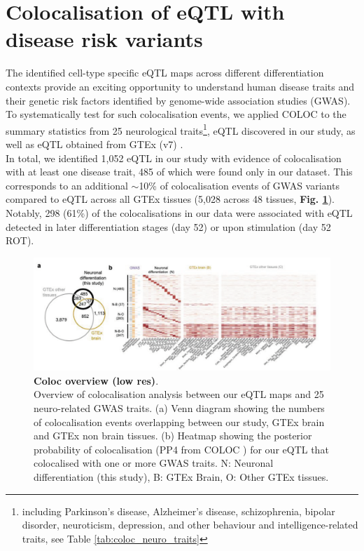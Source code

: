 \clearpage

\section{Colocalisation of eQTL with disease risk variants}
\label{sec:neuroseq_coloc}

The identified cell-type specific eQTL maps across different differentiation contexts provide an exciting opportunity to understand human disease traits and their genetic risk factors identified by genome-wide association studies (GWAS). 
To systematically test for such colocalisation events, we applied COLOC \cite{giambartolomei2014bayesian} to the summary statistics from 25 neurological traits\footnote{including Parkinson's disease, Alzheimer's disease, schizophrenia, bipolar disorder, neuroticism, depression, and other behaviour and intelligence-related traits, see Table \ref{tab:coloc_neuro_traits}}, eQTL discovered in our study, as well as eQTL obtained from GTEx (v7) \cite{gtex2017genetic}.\\

In total, we identified 1,052 eQTL in our study with evidence of colocalisation with at least one disease trait, 485 of which were found only in our dataset. 
This corresponds to an additional $\sim$10\% of colocalisation events of GWAS variants compared to eQTL across all GTEx tissues (5,028 across 48 tissues, \textbf{Fig. \ref{fig:neuroseq_coloc_overview}}). 
Notably, 298 (61\%) of the colocalisations in our data were associated with eQTL detected in later differentiation stages (day 52) or upon stimulation (day 52 ROT).\\

\begin{figure}[h]
\centering
\includegraphics[width=16cm]{Chapter5/Fig/neuroseq_coloc_overview.png}
\caption[Coloc overview]{\textbf{Coloc overview (low res)}.\\
Overview of colocalisation analysis between our eQTL maps and 25 neuro-related GWAS traits. 
(a) Venn diagram showing the numbers of colocalisation events overlapping between our study, GTEx brain and GTEx non brain tissues. 
(b) Heatmap showing the posterior probability of colocalisation (PP4 from COLOC \cite{giambartolomei2014bayesian}) for our eQTL that colocalised with one or more GWAS traits. 
N: Neuronal differentiation (this study), B: GTEx Brain, O: Other GTEx tissues.}
\label{fig:neuroseq_coloc_overview}
\end{figure}

